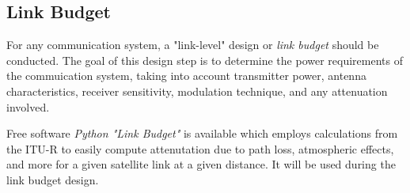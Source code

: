 \subsection{Link Budget}\label{sec:link_budget}
For any communication system, a "link-level" design or \textit{link budget} should be conducted. The goal of this design step is to determine the power requirements of the commuication system, taking into account transmitter power, antenna characteristics, receiver sensitivity, modulation technique, and any attenuation involved.

Free software \textit{Python "Link Budget"} is available which employs calculations from the ITU-R to easily compute attenutation due to path loss, atmospheric effects, and more for a given satellite link at a given distance. It will be used during the link budget design.